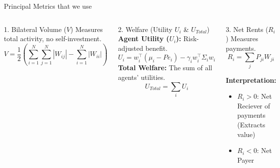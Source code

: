 \documentclass[aspectratio=169]{beamer}
\begin{document}
\begin{frame}{Principal Metrics that we use}

    \vspace{-0.5cm}
    \begin{columns}[T]
        \begin{block}{1. Bilateral Volume ($V$) }
            Measures total activity, no self-investment.
            $$V = \frac{1}{2} \left( \sum_{i=1}^N \sum_{j=1}^N |W_{ij}| - \sum_{i=1}^N |W_{ii}| \right)$$
        \end{block}
        
        \begin{block}{2. Welfare (Utility $U_i$ \& $U_{Total}$)}
            \textbf{Agent Utility ($U_i$):} Risk-adjusted benefit.
            $$U_i = w_i^\top (\mu_i - P e_i) - \gamma_i w_i^\top \Sigma_i w_i$$
            \textbf{Total Welfare:} The sum of all agents' utilities.
            $$U_{Total} = \sum\limits_{i} U_i$$
        \end{block}
        
        \begin{block}{3. Net Rents ($R_i$)}
            Measures payments.
            $$R_i = \sum_{j} P_{ji} W_{ji}$$
            
            \textbf{Interpretation:}
            \begin{itemize}
                \item \textcolor{SafeGreen}{$R_i > 0$}: Net Reciever of payments (Extracts value)
                \item \textcolor{AlertRed}{$R_i < 0$}: Net Payer 
            \end{itemize}
        \end{block}
        
    \end{columns}
\end{frame}
\end{document}
